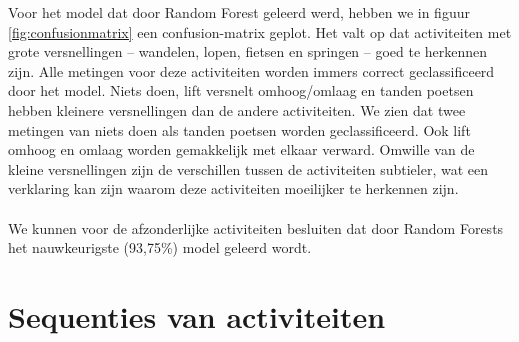 \documentclass{article}
\begin{document}
Voor het model dat door Random Forest geleerd werd, hebben we in figuur \ref{fig:confusionmatrix} een confusion-matrix geplot. Het valt op dat activiteiten met grote versnellingen -- wandelen, lopen, fietsen en springen -- goed te herkennen zijn. Alle metingen voor deze activiteiten worden immers correct geclassificeerd door het model. Niets doen, lift versnelt omhoog/omlaag en tanden poetsen hebben kleinere versnellingen dan de andere activiteiten. We zien dat twee metingen van niets doen als tanden poetsen worden geclassificeerd. Ook lift omhoog en omlaag worden gemakkelijk met elkaar verward. Omwille van de kleine versnellingen zijn de verschillen tussen de activiteiten subtieler, wat een verklaring kan zijn waarom deze activiteiten moeilijker te herkennen zijn.
\\~\\
We kunnen voor de afzonderlijke activiteiten besluiten dat door Random Forests het nauwkeurigste (93,75\%) model geleerd wordt.


\section{Sequenties van activiteiten}
\end{document}
